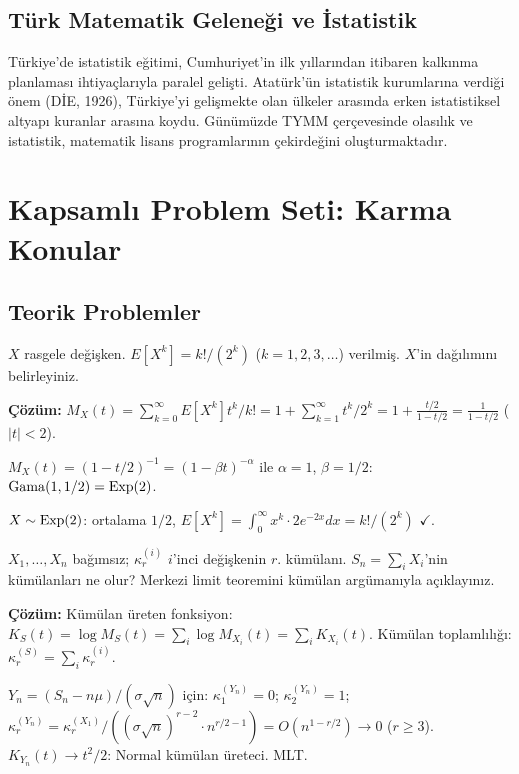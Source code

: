\subsection{Türk Matematik Geleneği ve İstatistik}

Türkiye'de istatistik eğitimi, Cumhuriyet'in ilk yıllarından itibaren kalkınma planlaması ihtiyaçlarıyla paralel gelişti. Atatürk'ün istatistik kurumlarına verdiği önem (DİE, 1926), Türkiye'yi gelişmekte olan ülkeler arasında erken istatistiksel altyapı kuranlar arasına koydu. Günümüzde TYMM çerçevesinde olasılık ve istatistik, matematik lisans programlarının çekirdeğini oluşturmaktadır.

\section{Kapsamlı Problem Seti: Karma Konular}
\label{app:karma_problemler}

\subsection{Teorik Problemler}

\begin{ornek}
$X$ rasgele değişken. $E[X^k]=k!/(2^k)$ ($k=1,2,3,\ldots$) verilmiş. $X$'in dağılımını belirleyiniz.

\textbf{Çözüm:} $M_X(t)=\sum_{k=0}^\infty E[X^k]t^k/k!=1+\sum_{k=1}^\infty t^k/2^k=1+\frac{t/2}{1-t/2}=\frac{1}{1-t/2}$ ($|t|<2$).

$M_X(t)=(1-t/2)^{-1}=(1-\beta t)^{-\alpha}$ ile $\alpha=1$, $\beta=1/2$: $\operatorname{Gama}(1,1/2)=\operatorname{Exp}(2)$.

$X\sim\operatorname{Exp}(2)$: ortalama $1/2$, $E[X^k]=\int_0^\infty x^k\cdot2e^{-2x}dx=k!/(2^k)$ $\checkmark$.
\end{ornek}

\begin{ornek}
$X_1,\ldots,X_n$ bağımsız; $\kappa_r^{(i)}$ $i$'inci değişkenin $r$. kümülanı. $S_n=\sum_i X_i$'nin kümülanları ne olur? Merkezi limit teoremini kümülan argümanıyla açıklayınız.

\textbf{Çözüm:} Kümülan üreten fonksiyon: $K_S(t)=\log M_S(t)=\sum_i\log M_{X_i}(t)=\sum_i K_{X_i}(t)$.
Kümülan toplamlılığı: $\kappa_r^{(S)}=\sum_i\kappa_r^{(i)}$.

$Y_n=(S_n-n\mu)/(\sigma\sqrt{n})$ için: $\kappa_1^{(Y_n)}=0$; $\kappa_2^{(Y_n)}=1$; $\kappa_r^{(Y_n)}=\kappa_r^{(X_1)}/((\sigma\sqrt{n})^{r-2}\cdot n^{r/2-1})=O(n^{1-r/2})\to0$ ($r\geq3$).
$K_{Y_n}(t)\to t^2/2$: Normal kümülan üreteci. MLT.
\end{ornek}

